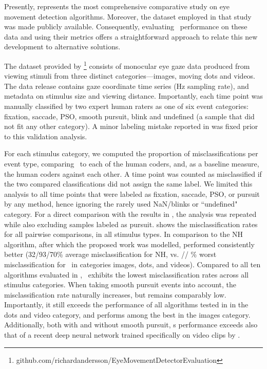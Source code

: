 Presently, \cite{Andersson2017} represents the most comprehensive comparative
study on eye movement detection algorithms. Moreover, the dataset employed
in that study was made publicly available. Consequently, evaluating \remodnav\
performance on these data and using their metrics offers a straightforward
approach to relate this new development to alternative solutions.

The dataset provided by
\cite{Andersson2017}\footnote{github.com/richardandersson/EyeMovementDetector\linebreak[0]Evaluation}
consists of monocular eye gaze data produced from viewing stimuli from three
distinct categories---images, moving dots and videos. The data release contains
gaze coordinate time series (\unit[500]{Hz} sampling rate), and metadata on
stimulus size and viewing distance.  Importantly, each time point was manually
classified by two expert human raters as one of six event categories: fixation,
saccade, PSO, smooth pursuit, blink and undefined (a sample that did not fit
any other category). A minor labeling mistake reported in \cite{Zemblys2018}
was fixed prior to this validation analysis.

For each stimulus category, we computed the proportion of misclassifications
per event type, comparing \remodnav\ to each of the human coders, and, as a
baseline measure, the human coders against each other.
%
A time point was counted as misclassified if the two compared classifications
did not assign the same label. We limited this analysis to all time points that
were labeled as fixation, saccade, PSO, or pursuit by any method, hence
ignoring the rarely used NaN/blinks or ``undefined" category. For a direct
comparison with the results in \cite{Andersson2017}, the analysis was repeated
while also excluding samples labeled as pursuit. \tab{mclf} shows the
misclassification rates for all pairwise comparisons, in all stimulus types.
In comparison to the NH algorithm, after which the proposed work was modelled,
\remodnav performed consistently better (32/93/70\% average misclassification for NH,
vs. \imgMNALMclfWOP/\dotsRAALMclfWOP/ \videoRAALMclfWOP\% worst
misclassification for \remodnav\ in categories images, dots, and videos). Compared to all ten
algorithms evaluated in \citet{Andersson2017}, \remodnav\ exhibits the lowest
misclassification rates across all stimulus categories.
%
When taking smooth pursuit events into account, the misclassification rate
naturally increases, but remains comparably low. Importantly, it still exceeds the
performance of all algorithms tested in \citet{Andersson2017} in the dots
and video category, and performs among the best in the images category.
Additionally, both with and without smooth pursuit, \remodnav s performance
exceeds also that of a recent deep neural network trained specifically on
video clips by \citet[ref. Table 7: 34\% misclassification versus \videoMNALMCLF\%
for \remodnav]{Startsev2018}.


